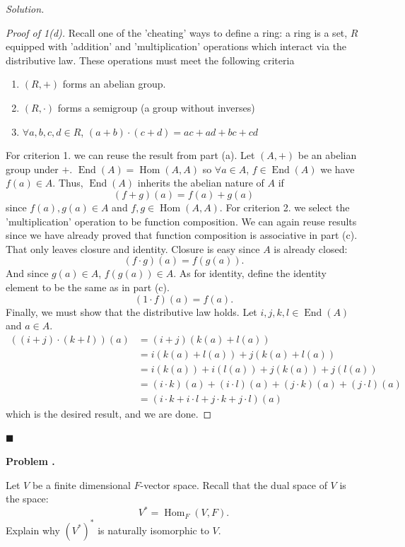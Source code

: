 \documentclass[11pt]{article}
\theoremstyle{plain}
\theoremstyle{definition}
\newcounter{problemnum}
\newenvironment{problem}[1][]{%
  \refstepcounter{problemnum}%
  \par\medskip\noindent\textbf{Problem \theproblemnum{#1}.}\ \itshape
}{\par\medskip}
\newenvironment{solution}{%
  \par\noindent\textit{Solution.}\
}{%
  \hfill$\blacksquare$\par\bigskip
}
\newcommand{\Hom}{\operatorname{Hom}}
\newcommand{\End}{\operatorname{End}}
\newcommand{\dual}[1]{#1^{\ast}}
\begin{document}
\begin{solution}
  \begin{proof}[Proof of 1(d)]
    Recall one of the 'cheating' ways to define a ring: a ring is a
    set, \( R \) equipped with 'addition' and 'multiplication'
    operations which interact via the distributive law. These
    operations must meet the following criteria
    \begin{enumerate}
      \item \((R, +)\) forms an abelian group.
      \item \( (R, \cdot) \) forms a semigroup (a group without inverses)
      \item \( \forall a,b,c,d\in R \), \( (a+b)\cdot(c+d)= ac + ad + bc + cd \)
    \end{enumerate}
    For criterion 1. we can reuse the result from part (a). Let \(
    (A, +) \) be an abelian group under \( + \). \( \End(A)=\Hom(A,A)
    \) so \( \forall a \in A \), \( f\in\End(A) \) we have \( f(a)\in
    A \). Thus, \( \End(A) \) inherits the abelian nature of \( A \) if
    \[
      (f + g)(a) = f(a) + g(a)
    \]
    since \( f(a),g(a)\in A \) and \( f,g\in\Hom(A,A) \). For
    criterion 2. we select the 'multiplication' operation to be
    function composition. We can again reuse results since we have
    already proved that function composition is associative in part
    (c). That only leaves closure and identity. Closure is easy since
    \( A \) is already closed:
    \[
      (f\cdot g)(a) = f(g(a)).
    \]
    And since \( g(a)\in A \), \( f(g(a))\in A \). As for identity,
    define the identity element to be the same as in part (c).
    \[
      (1\cdot f)(a) = f(a).
    \]
    Finally, we must show that the distributive law holds. Let \(
    i,j,k,l\in \End(A) \) and \( a \in A \).
    \begin{align*}
      ((i + j) \cdot (k + l))(a) &= (i + j)(k(a) + l(a)) \\
      &= i(k(a) + l(a)) + j(k(a) + l(a)) \\
      &= i(k(a)) + i(l(a)) + j(k(a)) + j(l(a)) \\
      &= (i\cdot k)(a) + (i\cdot l)(a) + (j\cdot k)(a) + (j\cdot l)(a) \\
      &= (i\cdot k + i\cdot l + j\cdot k + j\cdot l)(a)
    \end{align*}
    which is the desired result, and we are done.
  \end{proof}

\end{solution}

\begin{problem}
  Let $V$ be a finite dimensional $F$-vector space. Recall that the
  dual space of $V$ is the space: \[\dual{V} = \Hom_F(V, F).\]
  Explain why \((V^*)^*\) is naturally isomorphic to $V$.
\end{problem}
\end{document}
